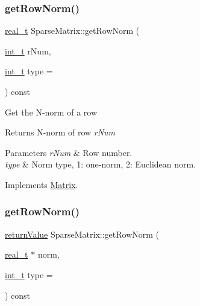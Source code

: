 \mbox{\label{class_sparse_matrix_acb880cf306a1e6c666c5374eaff8c9ce}} 
\subsubsection{\texorpdfstring{get\+Row\+Norm()}{getRowNorm()}\hspace{0.1cm}{\footnotesize\ttfamily [1/2]}}
{\footnotesize\ttfamily \hyperlink{qp_o_a_s_e_s__wrapper_8h_a0d00e2b3dfadee81331bbb39068570c4}{real\+\_\+t} Sparse\+Matrix\+::get\+Row\+Norm (\begin{DoxyParamCaption}\item[{\hyperlink{_types_8hpp_ab6fd6105e64ed14a0c9281326f05e623}{int\+\_\+t}}]{r\+Num,  }\item[{\hyperlink{_types_8hpp_ab6fd6105e64ed14a0c9281326f05e623}{int\+\_\+t}}]{type = {} }\end{DoxyParamCaption}) const\hspace{0.3cm}{\ttfamily [virtual]}}

Get the N-\/norm of a row \begin{DoxyReturn}{Returns}
N-\/norm of row {\itshape r\+Num} 
\end{DoxyReturn}

\begin{DoxyParams}{Parameters}
{\em r\+Num} & Row number. \\
\hline
{\em type} & Norm type, 1\+: one-\/norm, 2\+: Euclidean norm. \\
\hline
\end{DoxyParams}


Implements \hyperlink{class_matrix_ac4c0a395cd507ba0801b731765c586f7}{Matrix}.

\mbox{\label{class_sparse_matrix_aec5a39697ccc13df99551bdc79e93c7f}} 
\subsubsection{\texorpdfstring{get\+Row\+Norm()}{getRowNorm()}\hspace{0.1cm}{\footnotesize\ttfamily [2/2]}}
{\footnotesize\ttfamily \hyperlink{_message_handling_8hpp_a81d556f613bfbabd0b1f9488c0fa865e}{return\+Value} Sparse\+Matrix\+::get\+Row\+Norm (\begin{DoxyParamCaption}\item[{\hyperlink{qp_o_a_s_e_s__wrapper_8h_a0d00e2b3dfadee81331bbb39068570c4}{real\+\_\+t} $\ast$}]{norm,  }\item[{\hyperlink{_types_8hpp_ab6fd6105e64ed14a0c9281326f05e623}{int\+\_\+t}}]{type = {} }\end{DoxyParamCaption}) const\hspace{0.3cm}{\ttfamily [virtual]}}


